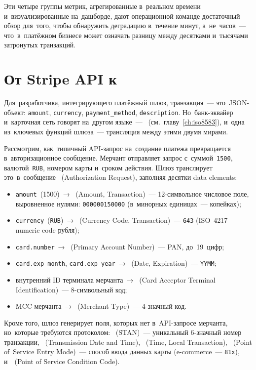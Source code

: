 Эти четыре группы метрик, агрегированные в~реальном времени
и~визуализированные на~дашборде, дают операционной команде
достаточный обзор для~того, чтобы обнаружить деградацию
в~течение минут, а~не~часов~--- что~в~платёжном бизнесе может
означать разницу между десятками и~тысячами затронутых
транзакций.


\section{От Stripe API к~}
\label{sec:gw-api-to-iso}

Для~разработчика, интегрирующего платёжный шлюз, транзакция~---
это~JSON-объект: \texttt{amount}, \texttt{currency},
\texttt{payment\_method}, \texttt{description}. Но~банк-эквайер
и~карточная сеть говорят на~другом языке~---
~(см.~главу~\ref{ch:iso8583}), и~одна из~ключевых
функций шлюза~--- трансляция между этими двумя мирами.

Рассмотрим, как~типичный API-запрос на~создание платежа
превращается в~авторизационное сообщение. Мерчант отправляет
запрос с~суммой~\texttt{1500}, валютой~\texttt{RUB},
номером карты и~сроком действия. Шлюз транслирует это~в~сообщение
~(Authorization Request), заполняя десятки data
elements:

\begin{itemize}
  \item \texttt{amount}~(1500)~→ ~(Amount, Transaction)~---
        12-символьное числовое поле, выровненное нулями:
        \texttt{000000150000} (в~минорных единицах~--- копейках);
  \item \texttt{currency}~(\texttt{RUB})~→ ~(Currency Code,
        Transaction)~--- \texttt{643} (ISO~4217 numeric code рубля);
  \item \texttt{card.number}~→ ~(Primary Account Number)~---
        PAN, до~19~цифр;
  \item \texttt{card.exp\_month}, \texttt{card.exp\_year}~→
        ~(Date, Expiration)~--- \texttt{YYMM};
  \item внутренний ID терминала мерчанта~→ ~(Card Acceptor
        Terminal Identification)~--- 8-символьный код;
  \item MCC мерчанта~→ ~(Merchant Type)~--- 4-значный код.
\end{itemize}

Кроме того, шлюз генерирует поля, которых нет в~API-запросе
мерчанта, но~которые требуются протоколом: ~(STAN)~---
уникальный 6-значный номер транзакции, ~(Transmission Date
and Time), ~(Time, Local Transaction), ~(Point
of~Service Entry Mode)~--- способ ввода данных карты
(e-commerce~--- \texttt{81x}), и~~(Point of Service
Condition Code).

